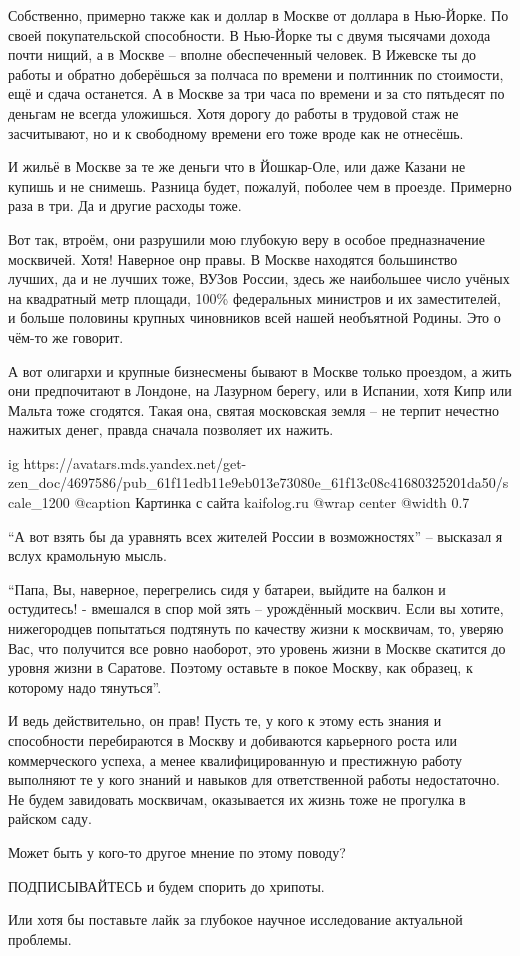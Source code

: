 Собственно, примерно также как и доллар в Москве от доллара в Нью-Йорке. По
своей покупательской способности. В Нью-Йорке ты с двумя тысячами дохода почти
нищий, а в Москве – вполне обеспеченный человек. В Ижевске ты до работы и
обратно доберёшься за полчаса по времени и полтинник по стоимости, ещё и сдача
останется. А в Москве за три часа по времени и за сто пятьдесят по деньгам не
всегда уложишься. Хотя дорогу до работы в трудовой стаж не засчитывают, но и к
свободному времени его тоже вроде как не отнесёшь.

И жильё в Москве за те же деньги что в Йошкар-Оле, или даже Казани не купишь и
не снимешь. Разница будет, пожалуй, поболее чем в проезде. Примерно раза в три.
Да и другие расходы тоже.

Вот так, втроём, они разрушили мою глубокую веру в особое предназначение
москвичей. Хотя! Наверное онр правы. В Москве находятся большинство лучших, да
и не лучших тоже, ВУЗов России, здесь же наибольшее число учёных на квадратный
метр площади, 100\% федеральных министров и их заместителей, и больше половины
крупных чиновников всей нашей необъятной Родины. Это о чём-то же говорит.

А вот олигархи и крупные бизнесмены бывают в Москве только проездом, а жить они
предпочитают в Лондоне, на Лазурном берегу, или в Испании, хотя Кипр или Мальта
тоже сгодятся. Такая она, святая московская земля – не терпит нечестно нажитых
денег, правда сначала позволяет их нажить.

\ifcmt
  ig https://avatars.mds.yandex.net/get-zen_doc/4697586/pub_61f11edb11e9eb013e73080e_61f13c08c41680325201da50/scale_1200
  @caption Картинка с сайта kaifolog.ru
	@wrap center
	@width 0.7
\fi

\enquote{А вот взять бы да уравнять всех жителей России в возможностях} – высказал я
вслух крамольную мысль.

\enquote{Папа, Вы, наверное, перегрелись сидя у батареи, выйдите на балкон и
остудитесь! - вмешался в спор мой зять – урождённый москвич. Если вы хотите,
нижегородцев попытаться подтянуть по качеству жизни к москвичам, то, уверяю
Вас, что получится все ровно наоборот, это уровень жизни в Москве скатится до
уровня жизни в Саратове. Поэтому оставьте в покое Москву, как образец, к
которому надо тянуться}.

И ведь действительно, он прав! Пусть те, у кого к этому есть знания и
способности перебираются в Москву и добиваются карьерного роста или
коммерческого успеха, а менее квалифицированную и престижную работу выполняют
те у кого знаний и навыков для ответственной работы недостаточно. Не будем
завидовать москвичам, оказывается их жизнь тоже не прогулка в райском саду.

Может быть у кого-то другое мнение по этому поводу?

ПОДПИСЫВАЙТЕСЬ и будем спорить до хрипоты.

Или хотя бы поставьте лайк за глубокое научное исследование актуальной
проблемы.
